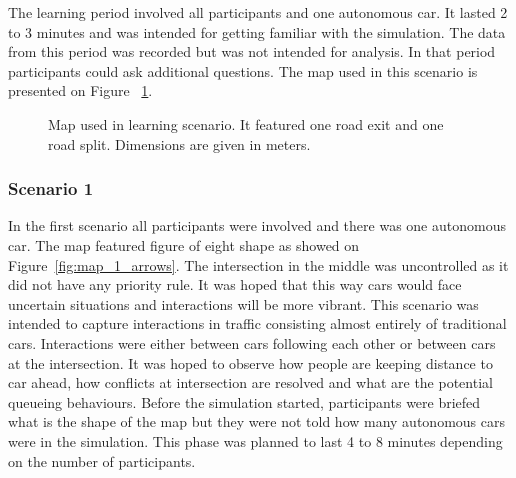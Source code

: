 \documentclass[11pt,english,twoside]{article}
\begin{document}
The learning period involved all participants and one autonomous car. It lasted 2 to 3 minutes and was intended for getting familiar with the simulation. The data from this period was recorded but was not intended for analysis. In that period participants could ask additional questions. The map used in this scenario is presented on Figure ~\ref{fig:map_0_arrows}.


\begin{figure}[!] %
\caption{Map used in learning scenario. It featured one road exit and one road split. Dimensions are given in meters.}
\label{fig:map_0_arrows}
\end{figure}


\subsubsection{Scenario 1}

In the first scenario all participants were involved and there was one autonomous car. The map featured figure of eight shape as showed on Figure~\ref{fig:map_1_arrows}. The intersection in the middle was uncontrolled as it did not have any priority rule. It was hoped that this way cars would face uncertain situations and interactions will be more vibrant. This scenario was intended to capture interactions in traffic consisting almost entirely of traditional cars. Interactions were either between cars following each other or between cars at the intersection. It was hoped to observe how people are keeping distance to car ahead, how conflicts at intersection are resolved and what are the potential queueing behaviours. Before the simulation started, participants were briefed what is the shape of the map but they were not told how many autonomous cars were in the simulation. This phase was planned to last 4 to 8 minutes depending on the number of participants.
\end{document}
